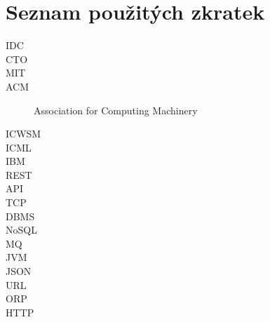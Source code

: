 \documentclass[thesis=M,czech]{FITthesis}[2014/05/07]
\begin{document}



\appendix

\chapter{Seznam použitých zkratek}
\begin{description}
	\item[IDC] 
	\item[CTO]
	\item[MIT]	
	\item[ACM] Association for Computing Machinery	
	\item[ICWSM]	
	\item[ICML]	
	\item[IBM]	
	\item[REST]	
	\item[API]							
	\item[TCP]
	\item[DBMS]
	\item[NoSQL]
	\item[MQ]
	\item[JVM]
	\item[JSON]
	\item[URL]
	\item[ORP]
	\item[HTTP]
\end{description}
\end{document}
